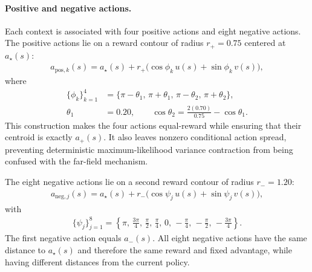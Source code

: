 \documentclass[sigconf,anonymous,review]{acmart}
\theoremstyle{acmdefinition}
\begin{document}
\paragraph{Positive and negative actions.}
Each context is associated with four positive actions and eight negative
actions. The positive actions lie on a reward contour of radius
$r_+=0.75$
centered at $a_\star(s)$:
\begin{equation}
\begin{aligned}
    a_{\mathrm{pos},k}(s)
    =
    a_\star(s)
    +
    r_+
    \bigl(
        \cos\phi_k\,u(s)
        +
        \sin\phi_k\,v(s)
    \bigr),
\end{aligned}
\label{eq:cu1_positive_actions}
\end{equation}
where
\begin{equation}
\begin{aligned}
    \{\phi_k\}_{k=1}^{4}
    &=
    \{
        \pi-\theta_1,\,
        \pi+\theta_1,\,
        \pi-\theta_2,\,
        \pi+\theta_2
    \}, \\
    \theta_1
    &=
    0.20,
    \qquad
    \cos\theta_2
    =
    \frac{2(0.70)}{0.75}
    -
    \cos\theta_1.
\end{aligned}
\label{eq:cu1_positive_angles}
\end{equation}
This construction makes the four actions equal-reward while ensuring
that their centroid is exactly $a_+(s)$. It also leaves nonzero
conditional action spread, preventing deterministic maximum-likelihood
variance contraction from being confused with the far-field mechanism.

The eight negative actions lie on a second reward contour of radius
$r_-=1.20$:
\begin{equation}
\begin{aligned}
    a_{\mathrm{neg},j}(s)
    =
    a_\star(s)
    +
    r_-
    \bigl(
        \cos\psi_j\,u(s)
        +
        \sin\psi_j\,v(s)
    \bigr),
\end{aligned}
\label{eq:cu1_negative_actions}
\end{equation}
with
\begin{equation}
\begin{aligned}
    \{\psi_j\}_{j=1}^{8}
    =
    \left\{
        \pi,\,
        \frac{3\pi}{4},\,
        \frac{\pi}{2},\,
        \frac{\pi}{4},\,
        0,\,
        -\frac{\pi}{4},\,
        -\frac{\pi}{2},\,
        -\frac{3\pi}{4}
    \right\}.
\end{aligned}
\label{eq:cu1_negative_angles}
\end{equation}
The first negative action equals $a_-(s)$. All eight negative actions
have the same distance to $a_\star(s)$ and therefore the same reward and
fixed advantage, while having different distances from the current
policy.
\end{document}
